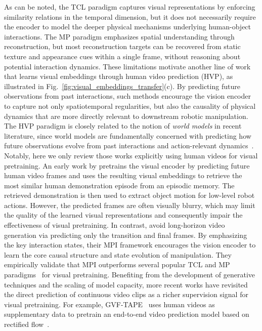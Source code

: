 \documentclass[Afour,sageh,times]{sagej}
\begin{document}
As can be noted, the TCL paradigm captures visual representations by enforcing similarity relations in the temporal dimension, but it does not necessarily require the encoder to model the deeper physical mechanisms underlying human-object interactions. The MP paradigm emphasizes spatial understanding through reconstruction, but most reconstruction targets can be recovered from static texture and appearance cues within a single frame, without reasoning about potential interaction dynamics. These limitations motivate another line of work that learns visual embeddings through human video prediction (HVP), as illustrated in Fig.~\ref{fig:visual_embeddings_transfer}(c). By predicting future observations from past interactions, such methods encourage the vision encoder to capture not only spatiotemporal regularities, but also the causality of physical dynamics that are more directly relevant to downstream robotic manipulation. 
The HVP paradigm is closely related to the notion of \textit{world models} in recent literature, since world models are fundamentally concerned with predicting how future observations evolve from past interactions and action-relevant dynamics~\citep{liao2025genie,ye2026world}. Notably, here we only review those works explicitly using human videos for visual pretraining.
An early work by \cite{rothfuss2018deep} pretrains the visual encoder by predicting future human video frames and uses the resulting visual embeddings to retrieve the most similar human demonstration episode from an episodic memory. The retrieved demonstration is then used to extract object motion for low-level robot actions. However, the predicted frames are often visually blurry, which may limit the quality of the learned visual representations and consequently impair the effectiveness of visual pretraining. In contrast, \cite{zeng2024learning} avoid long-horizon video generation via predicting only the transition and final frames. By emphasizing the key interaction states, their MPI framework encourages the vision encoder to learn the core causal structure and state evolution of manipulation. They empirically validate that MPI outperforms several popular TCL and MP paradigms~\citep{nair2022r3m,xiao2022masked,karamcheti2023language} for visual pretraining. Benefiting from the development of generative techniques and the scaling of model capacity, more recent works have revisited the direct prediction of continuous video clips as a richer supervision signal for visual pretraining. For example, GVF-TAPE~\citep{zhang2025generative} uses human videos as supplementary data to pretrain an end-to-end video prediction model based on rectified flow~\citep{liu2022flow}. 
\end{document}
